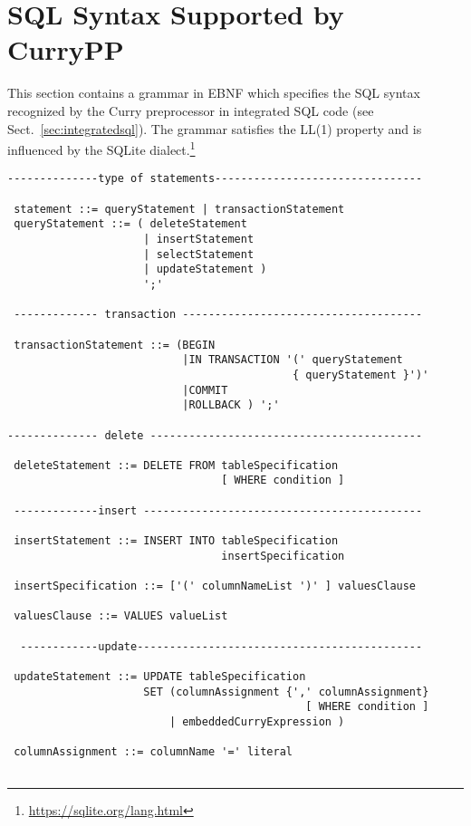 \section{SQL Syntax Supported by CurryPP}
\label{app:sqlsyntax}

This section contains a grammar in EBNF which specifies
the SQL syntax recognized by the Curry preprocessor
in integrated SQL code (see Sect.~\ref{sec:integratedsql}).
%
The grammar satisfies the LL(1) property and is influenced by the
SQLite  dialect.\footnote{\url{https://sqlite.org/lang.html}}

\begin{lstlisting} 
--------------type of statements--------------------------------

 statement ::= queryStatement | transactionStatement  
 queryStatement ::= ( deleteStatement 
                     | insertStatement 
                     | selectStatement 
                     | updateStatement )
                     ';'

 ------------- transaction -------------------------------------
 
 transactionStatement ::= (BEGIN                                        
                           |IN TRANSACTION '(' queryStatement 
                                            { queryStatement }')'  
                           |COMMIT                                       
                           |ROLLBACK ) ';'

-------------- delete ------------------------------------------

 deleteStatement ::= DELETE FROM tableSpecification 
                                 [ WHERE condition ]

 -------------insert -------------------------------------------
 
 insertStatement ::= INSERT INTO tableSpecification 
                                 insertSpecification

 insertSpecification ::= ['(' columnNameList ')' ] valuesClause

 valuesClause ::= VALUES valueList

  ------------update--------------------------------------------
  
 updateStatement ::= UPDATE tableSpecification 
                     SET (columnAssignment {',' columnAssignment} 
                                              [ WHERE condition ] 
                         | embeddedCurryExpression )
 
 columnAssignment ::= columnName '=' literal
 

\end{lstlisting}
